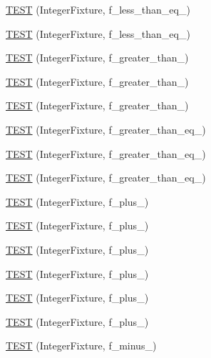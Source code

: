 \begin{DoxyCompactItemize}
\item 
\hyperlink{TestInteger_8c_09_09_a79c68d5c1653e1b34b28bafe98aecc83}{T\-E\-S\-T} (Integer\-Fixture, f\-\_\-less\-\_\-than\-\_\-eq\-\_)
\item 
\hyperlink{TestInteger_8c_09_09_ab12dc2f9b4ae1491239e8a9c5b667b17}{T\-E\-S\-T} (Integer\-Fixture, f\-\_\-less\-\_\-than\-\_\-eq\-\_)
\item 
\hyperlink{TestInteger_8c_09_09_a73dc0d3bdf8ce7956856268859fdb308}{T\-E\-S\-T} (Integer\-Fixture, f\-\_\-greater\-\_\-than\-\_)
\item 
\hyperlink{TestInteger_8c_09_09_ac8587dbe8467a3d75704698bd96a3940}{T\-E\-S\-T} (Integer\-Fixture, f\-\_\-greater\-\_\-than\-\_)
\item 
\hyperlink{TestInteger_8c_09_09_a836a9bfba639688878367430a051c41e}{T\-E\-S\-T} (Integer\-Fixture, f\-\_\-greater\-\_\-than\-\_)
\item 
\hyperlink{TestInteger_8c_09_09_a8aa2e39077146443fc054fdb59822036}{T\-E\-S\-T} (Integer\-Fixture, f\-\_\-greater\-\_\-than\-\_\-eq\-\_)
\item 
\hyperlink{TestInteger_8c_09_09_a2c39aeca0277a460d12a4fbf09327383}{T\-E\-S\-T} (Integer\-Fixture, f\-\_\-greater\-\_\-than\-\_\-eq\-\_)
\item 
\hyperlink{TestInteger_8c_09_09_af996ff313ae5b166cffa12dd7debd4dc}{T\-E\-S\-T} (Integer\-Fixture, f\-\_\-greater\-\_\-than\-\_\-eq\-\_)
\item 
\hyperlink{TestInteger_8c_09_09_a281452f2544b37cd908581100e1f68ce}{T\-E\-S\-T} (Integer\-Fixture, f\-\_\-plus\-\_)
\item 
\hyperlink{TestInteger_8c_09_09_a0467c5cee94a7c32ed33fd853c93b3a6}{T\-E\-S\-T} (Integer\-Fixture, f\-\_\-plus\-\_)
\item 
\hyperlink{TestInteger_8c_09_09_ac4164f23db3cae226f195eae093967f8}{T\-E\-S\-T} (Integer\-Fixture, f\-\_\-plus\-\_)
\item 
\hyperlink{TestInteger_8c_09_09_a8bea23c00c0cf61062ca8b63698ff5ef}{T\-E\-S\-T} (Integer\-Fixture, f\-\_\-plus\-\_)
\item 
\hyperlink{TestInteger_8c_09_09_a25938edcc0ca0460b515127e81f768bf}{T\-E\-S\-T} (Integer\-Fixture, f\-\_\-plus\-\_)
\item 
\hyperlink{TestInteger_8c_09_09_acafa97a36654c0387c39a3c15bae62e2}{T\-E\-S\-T} (Integer\-Fixture, f\-\_\-plus\-\_)
\item 
\hyperlink{TestInteger_8c_09_09_a2a8082b4e62fadc92a2e53daa9ceb715}{T\-E\-S\-T} (Integer\-Fixture, f\-\_\-minus\-\_)

\end{DoxyCompactItemize}
